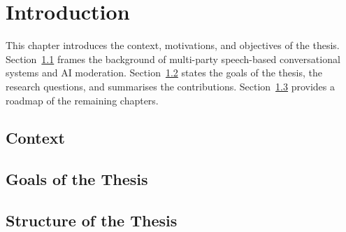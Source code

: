 \chapter{Introduction}
\label{ch:introduction}


This chapter introduces the context, motivations, and objectives of the
thesis. Section~\ref{sec:intro-context} frames the background of
multi-party speech-based conversational systems and AI moderation.
Section~\ref{sec:intro-goals} states the goals of the thesis, the
research questions, and summarises the contributions.
Section~\ref{sec:intro-structure} provides a roadmap of the remaining
chapters.

\section{Context}
\label{sec:intro-context}

\section{Goals of the Thesis}
\label{sec:intro-goals}

\section{Structure of the Thesis}
\label{sec:intro-structure}
